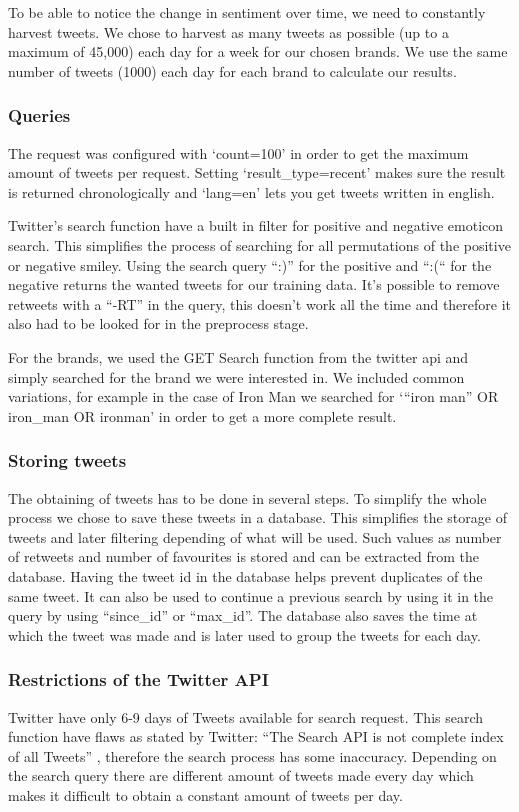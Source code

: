\documentclass[a4paper]{article}
\begin{document}
To be able to notice the change in sentiment over time, we need to constantly harvest tweets. We chose to harvest as many tweets as possible (up to a maximum of 45,000) each day for a week for our chosen brands. We use the same number of tweets (1000) each day for each brand to calculate our results.

\subsubsection{Queries}
The request was configured with ‘count=100’ in order to get the maximum amount of tweets per request. Setting ‘result\_type=recent’ makes sure the result is returned chronologically and ‘lang=en’ lets you get tweets written in english.

Twitter's search function have a built in filter for positive and negative emoticon search. This simplifies the process of searching for all permutations of the positive or negative smiley. Using the search query “:)” for the positive and “:(“ for the negative returns the wanted tweets for our training data. It’s possible to remove retweets with a “-RT” in the query, this doesn’t work all the time and therefore it also had to be looked for in the preprocess stage. 

For the brands, we used the GET Search function from the twitter api and simply searched for the brand we were interested in. We included common variations, for example in the case of Iron Man we searched for ‘“iron man” OR iron\_man OR ironman’ in order to get a more complete result.

\subsubsection{Storing tweets}
The obtaining of tweets has to be done in several steps. To simplify the whole process we chose to save these tweets in a database. This simplifies the storage of tweets and later filtering depending of what will be used. Such values as number of retweets and number of favourites is stored and can be extracted from the database. Having the tweet id in the database helps prevent duplicates of the same tweet. It can also be used to continue a previous search by using it in the query by using “since\_id” or “max\_id”. The database also saves the time at which the tweet was made and is later used to group the tweets for each day.

\subsubsection{Restrictions of the Twitter API}
Twitter have only 6-9 days of Tweets available for search request. This search function have flaws as stated by Twitter: “The Search API is not complete index of all Tweets” \cite{tw_search}, therefore the search process has some inaccuracy. Depending on the search query there are different amount of tweets made every day which makes it difficult to obtain a constant amount of tweets per day.
\end{document}
